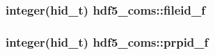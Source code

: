 \subsubsection[{fileid\+\_\+f}]{\setlength{\rightskip}{0pt plus 5cm}integer(hid\+\_\+t) hdf5\+\_\+coms\+::fileid\+\_\+f}\label{namespacehdf5__coms_a5bdf3f7a13856c782dc68d5c2bffccb4}
\hypertarget{namespacehdf5__coms_a84009e52b52f9347b40c3e5d71cb1eb0}{}
\subsubsection[{prpid\+\_\+f}]{\setlength{\rightskip}{0pt plus 5cm}integer(hid\+\_\+t) hdf5\+\_\+coms\+::prpid\+\_\+f}\label{namespacehdf5__coms_a84009e52b52f9347b40c3e5d71cb1eb0}
